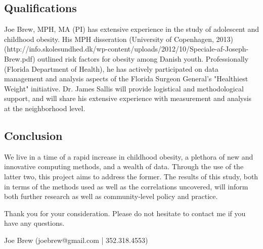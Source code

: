 \documentclass[11pt]{article}
\begin{document}
\subsection*{Qualifications}
Joe Brew, MPH, MA (PI) has extensive experience in the study of adolescent and childhood obesity.  His MPH disseration (University of Copenhagen, 2013) (http://info.skolesundhed.dk/wp-content/uploads/2012/10/Speciale-af-Joseph-Brew.pdf) outlined risk factors for obesity among Danish youth.  Professionally (Florida Department of Health), he has actively participated on data management and analysis aspects of the Florida Surgeon General's "Healthiest Weight" initiative.  Dr. James Sallis will provide logistical and methodological support, and will share his extensive experience with measurement and analysis at the neighborhood level.

\subsection*{Conclusion}

We live in a time of a rapid increase in childhood obesity, a plethora of new and innovative computing methods, and a wealth of data.  Through the use of the latter two, this project aims to address the former.    
The results of this study, both in terms of the methods used as well as the correlations uncovered, will inform both further research as well as community-level policy and practice.  

\vspace{3mm}

\noindent Thank you for your consideration.  Please do not hesitate to contact me if you have any questions.
\vspace{5mm}

\noindent Joe Brew
(joebrew@gmail.com | 352.318.4553)

\end{document}
